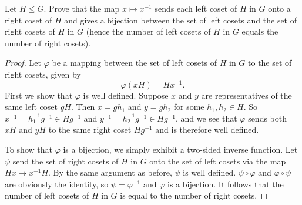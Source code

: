  Let $H\leq G$. Prove that the map $x\mapsto x^{-1}$
sends each left coset of $H$ in $G$ onto a right coset of $H$ and
gives a bijection between the set of left cosets and the set of right
cosets of $H$ in $G$ (hence the number of left cosets of $H$ in $G$
equals the number of right cosets).
\begin{proof}
  Let $\varphi$ be a mapping between the set of left cosets of $H$ in
  $G$ to the set of right cosets, given by
  \begin{equation*}
    \varphi(xH) = Hx^{-1}.
  \end{equation*}
  First we show that $\varphi$ is well defined. Suppose $x$ and $y$
  are representatives of the same left coset $gH$. Then $x = gh_1$ and
  $y = gh_2$ for some $h_1,h_2\in H$. So
  $x^{-1} = h_1^{-1}g^{-1}\in Hg^{-1}$ and
  $y^{-1} = h_2^{-1}g^{-1}\in Hg^{-1}$, and we see that $\varphi$
  sends both $xH$ and $yH$ to the same right coset $Hg^{-1}$ and is
  therefore well defined.

  To show that $\varphi$ is a bijection, we simply exhibit a two-sided
  inverse function. Let $\psi$ send the set of right cosets of $H$ in
  $G$ onto the set of left cosets via the map $Hx \mapsto x^{-1}H$. By
  the same argument as before, $\psi$ is well
  defined. $\psi\circ\varphi$ and $\varphi\circ\psi$ are obviously the
  identity, so $\psi = \varphi^{-1}$ and $\varphi$ is a bijection. It
  follows that the number of left cosets of $H$ in $G$ is equal to the
  number of right cosets.
\end{proof}
